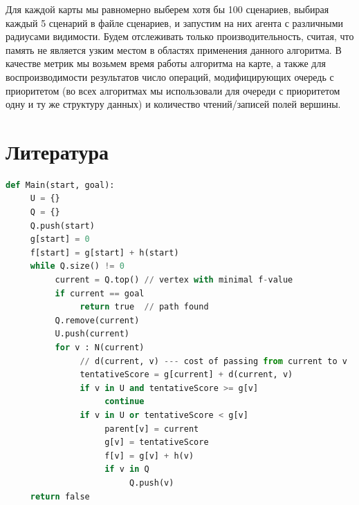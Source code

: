 \documentclass[11pt]{article}
\begin{document}
    Для каждой карты мы равномерно выберем хотя бы 100 сценариев, выбирая каждый 5 сценарий в файле сценариев, и запустим на них агента с различными радиусами видимости.
    Будем отслеживать только производительность, считая, что память не является узким местом в областях применения данного алгоритма.
    В качестве метрик мы возьмем время работы алгоритма на карте, а также для воспроизводимости результатов число операций, модифицирующих очередь с приоритетом (во всех алгоритмах мы использовали для очереди с приоритетом одну и ту же структуру данных) и количество чтений/записей полей вершины.







    \section{Литература}
    
    


\begin{lstlisting}[language=Python, caption=A*]
def Main(start, goal):
     U = {}
     Q = {}
     Q.push(start)
     g[start] = 0
     f[start] = g[start] + h(start)
     while Q.size() != 0
          current = Q.top() // vertex with minimal f-value
          if current == goal
               return true  // path found
          Q.remove(current)
          U.push(current)
          for v : N(current)
               // d(current, v) --- cost of passing from current to v
               tentativeScore = g[current] + d(current, v)
               if v in U and tentativeScore >= g[v]
                    continue
               if v in U or tentativeScore < g[v]
                    parent[v] = current
                    g[v] = tentativeScore
                    f[v] = g[v] + h(v)
                    if v in Q
                         Q.push(v)
     return false
\end{lstlisting}
\end{document}
